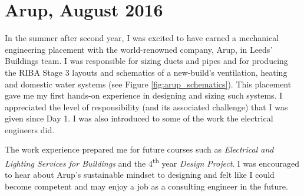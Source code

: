 

\section{Arup, August 2016}


In the summer after second year, I was excited to have earned a mechanical engineering placement with the world-renowned company, Arup, in Leeds' Buildings team.
I was responsible for sizing ducts and pipes and for producing the RIBA Stage 3 layouts and schematics of a new-build’s ventilation, heating and domestic water systems (see Figure \ref{fig:arup_schematics}).
This placement gave me my first hands-on experience in designing and sizing such systems.
I appreciated the level of responsibility (and its associated challenge) that I was given since Day 1.
I was also introduced to some of the work the electrical engineers did.

The work experience prepared me for future courses such as \textit{Electrical and Lighting Services for Buildings} and the 4\textsuperscript{th} year \textit{Design Project}.
I was encouraged to hear about Arup's sustainable mindset to designing and felt like I could become competent and may enjoy a job as a consulting engineer in the future.


